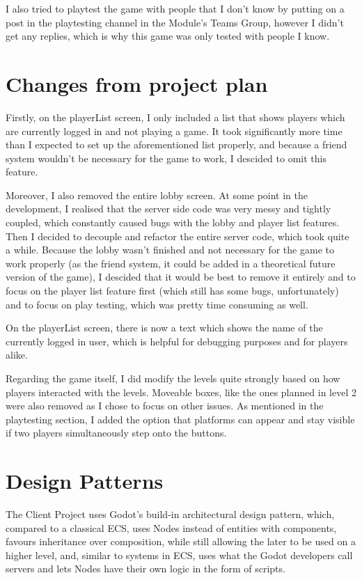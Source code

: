 \documentclass{article}
\begin{document}
\bigskip
I also tried to playtest the game with people that I don't know by putting on a post in the playtesting channel in the Module's Teams Group, however I didn't get any replies, which is why this game was only tested with people I know.


\section{Changes from project plan}
Firstly, on the playerList screen, I only included a list that shows players which are currently logged in and not playing a game. It took significantly more time than I expected to set up the aforementioned list properly, and because a friend system wouldn't be necessary for the game to work, I descided to omit this feature. 

\bigskip
Moreover, I also removed the entire lobby screen. At some point in the development, I realised that the server side code was very messy and tightly coupled, which constantly caused bugs with the lobby and player list features. Then I decided to decouple and refactor the entire server code, which took quite a while. Because the lobby wasn't finished and not necessary for the game to work properly (as the friend system, it could be added in a theoretical future version of the game), I descided that it would be best to remove it entirely and to focus on the player list feature first (which still has some bugs, unfortunately) and to focus on play testing, which was pretty time consuming as well.

\bigskip
On the playerList screen, there is now a text which shows the name of the currently logged in user, which is helpful for debugging purposes and for players alike.

\bigskip
Regarding the game itself, I did modify the levels quite strongly based on how players interacted with the levels. Moveable boxes, like the ones planned in level 2 were also removed as I chose to focus on other issues. As mentioned in the playtesting section, I added the option that platforms can appear and stay visible if two players simultaneously step onto the buttons. 

\section{Design Patterns}
The Client Project uses Godot's build-in architectural design pattern, which, compared to a classical ECS, uses Nodes instead of entities with components, favours inheritance over composition, while still allowing the later to be used on a higher level, and, similar to systems in ECS, uses what the Godot developers call servers and lets Nodes have their own logic in the form of scripts. 
\end{document}
